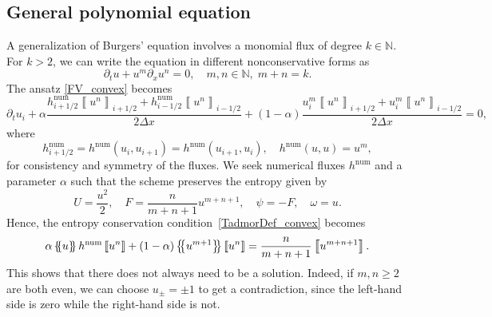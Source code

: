 \documentclass[]{scrartcl}
\newcommand*{\ldblbrace}{\{\mskip-5mu \left \{}
\newcommand*{\rdblbrace}{ \}\mskip-5mu \right \}}
\newcommand{\mean}[1]{\left\ldblbrace #1 \right\rdblbrace}
\newcommand{\jump}[1]{\left\llbracket #1  \right\rrbracket}
\theoremstyle{definition}
\begin{document}
\subsection{General polynomial equation}
\label{sec:general_polynomial_equation}
A generalization of Burgers' equation involves a monomial flux of degree $k \in \mathbb{N}$.
For $k > 2$, we can write the equation in different nonconservative forms as
\begin{equation}
\partial_t u + u^m \partial_x u^n = 0, \quad m, n \in \mathbb{N}, \; m + n = k.
\end{equation}
The ansatz \eqref{FV_convex} becomes
\begin{equation}\label{eq_poly}
\partial_t u_i + \alpha \frac{h^{\mathrm{num}}_{i+1/2} \jump{u^n}_{i+1/2} + h^{\mathrm{num}}_{i-1/2}\jump{u^n}_{i-1/2} }{2 \Delta x} + \left (1- \alpha \right ) \frac{u^m_i \jump{u^n}_{i+1/2} + u^m_i \jump{u^n}_{i-1/2}}{2 \Delta x} = 0,
\end{equation}
where
\begin{equation}
h^{\mathrm{num}}_{i+1/2}= h^{\mathrm{num}}(u_i, u_{i+1} ) = h^{\mathrm{num}}(u_{i+1}, u_{i} ), \quad h^{\mathrm{num}}(u, u) = u^m,
\end{equation}
for consistency and symmetry of the fluxes. We seek numerical fluxes $h^{\mathrm{num}}$ and a parameter $\alpha$ such that the scheme preserves the entropy given by
\begin{equation}
    U = \frac{u^2}{2}, \quad
    F = \frac{n}{m+n+1}u^{m+n+1}, \quad
    \psi = -F, \quad
    \omega = u.
\end{equation}
Hence, the entropy conservation condition~\eqref{TadmorDef_convex} becomes
\begin{equation}
    \alpha \mean{u} h^{\mathrm{num}} \jump{u^n} + (1-\alpha) \mean{u^{m+1}} \jump{u^n} = \frac{n}{m+n+1} \jump{u^{m+n+1}}.
\end{equation}
This shows that there does not always need to be a solution.
Indeed, if $m, n \ge 2$ are both even, we can choose $u_\pm = \pm 1$ to get a contradiction, since the left-hand side is zero while the right-hand side is not.
\end{document}

